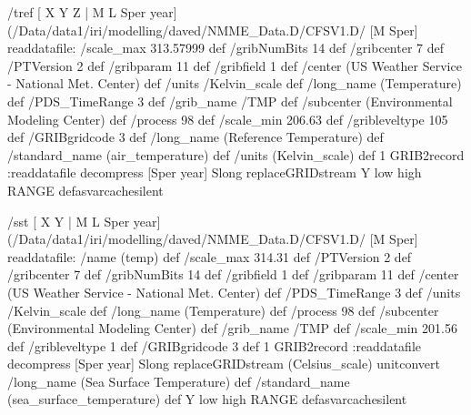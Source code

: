 \begin{ingrid}
 /tref{
[ X Y Z | M L Sper year] 
(/Data/data1/iri/modelling/daved/NMME_Data.D/CFSV1.D/%
 [M Sper]
readdatafile:
/scale_max 313.57999 def
 /gribNumBits 14 def
 /gribcenter 7 def
 /PTVersion 2 def
 /gribparam 11 def
 /gribfield 1 def
 /center (US Weather Service - National Met. Center) def
 /units /Kelvin_scale def
 /long_name (Temperature) def
 /PDS_TimeRange 3 def
 /grib_name /TMP def
 /subcenter (Environmental Modeling Center) def
 /process 98 def
 /scale_min 206.63 def
 /gribleveltype 105 def
 /GRIBgridcode 3 def
/long_name (Reference Temperature) def
/standard_name (air_temperature) def
/units (Kelvin_scale) def
 1 GRIB2record :readdatafile
decompress
[Sper year] Slong replaceGRIDstream
Y low high RANGE
}defasvarcachesilent
\end{ingrid}
\begin{ingrid}
 /sst{
[ X Y | M L Sper year] 
(/Data/data1/iri/modelling/daved/NMME_Data.D/CFSV1.D/%
 [M Sper]
readdatafile:
/name (temp) def
 /scale_max 314.31 def
 /PTVersion 2 def
 /gribcenter 7 def
 /gribNumBits 14 def
 /gribfield 1 def
 /gribparam 11 def
 /center (US Weather Service - National Met. Center) def
 /PDS_TimeRange 3 def
 /units /Kelvin_scale def
 /long_name (Temperature) def
 /process 98 def
 /subcenter (Environmental Modeling Center) def
 /grib_name /TMP def
 /scale_min 201.56 def
 /gribleveltype 1 def
 /GRIBgridcode 3 def
1 GRIB2record :readdatafile
decompress
[Sper year] Slong replaceGRIDstream
(Celsius_scale) unitconvert
/long_name (Sea Surface Temperature) def
/standard_name (sea_surface_temperature) def
Y low high RANGE
}defasvarcachesilent
\end{ingrid}
